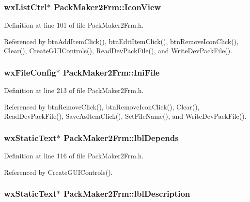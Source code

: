 \subsubsection{\setlength{\rightskip}{0pt plus 5cm}wx\-List\-Ctrl$\ast$ {\bf Pack\-Maker2Frm::Icon\-View}\hspace{0.3cm}{\tt  [private]}}\label{class_pack_maker2_frm_c6b32a9dcebd8f6256f1f531ffcc11a6}




Definition at line 101 of file Pack\-Maker2Frm.h.

Referenced by btn\-Add\-Item\-Click(), btn\-Edit\-Item\-Click(), btn\-Remove\-Icon\-Click(), Clear(), Create\-GUIControls(), Read\-Dev\-Pack\-File(), and Write\-Dev\-Pack\-File().
\subsubsection{\setlength{\rightskip}{0pt plus 5cm}wx\-File\-Config$\ast$ {\bf Pack\-Maker2Frm::Ini\-File}\hspace{0.3cm}{\tt  [private]}}\label{class_pack_maker2_frm_9c950237ff5a01d812114c14e330f3c3}




Definition at line 213 of file Pack\-Maker2Frm.h.

Referenced by btn\-Remove\-Click(), btn\-Remove\-Icon\-Click(), Clear(), Read\-Dev\-Pack\-File(), Save\-As\-Item\-Click(), Set\-File\-Name(), and Write\-Dev\-Pack\-File().
\subsubsection{\setlength{\rightskip}{0pt plus 5cm}wx\-Static\-Text$\ast$ {\bf Pack\-Maker2Frm::lbl\-Depends}\hspace{0.3cm}{\tt  [private]}}\label{class_pack_maker2_frm_eda848ace5f1b2be7fc656cd549e632a}




Definition at line 116 of file Pack\-Maker2Frm.h.

Referenced by Create\-GUIControls().
\subsubsection{\setlength{\rightskip}{0pt plus 5cm}wx\-Static\-Text$\ast$ {\bf Pack\-Maker2Frm::lbl\-Description}\hspace{0.3cm}{\tt  [private]}}\label{class_pack_maker2_frm_0c2c3886f765e7b53e74c0c4d119c42b}





